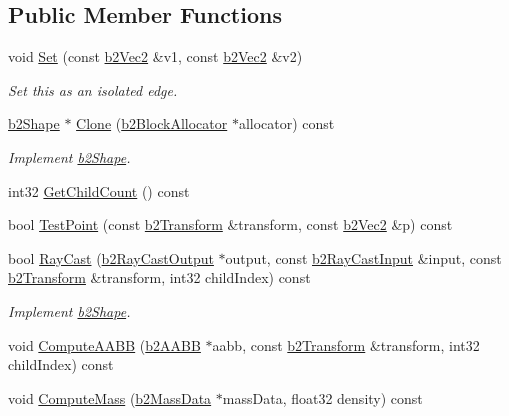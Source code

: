 \subsection*{Public Member Functions}
\begin{DoxyCompactItemize}
\item 
void \hyperlink{classb2_edge_shape_a67dd3b17630a600033cb4380697a4e9d}{Set} (const \hyperlink{structb2_vec2}{b2\+Vec2} \&v1, const \hyperlink{structb2_vec2}{b2\+Vec2} \&v2)\hypertarget{classb2_edge_shape_a67dd3b17630a600033cb4380697a4e9d}{}\label{classb2_edge_shape_a67dd3b17630a600033cb4380697a4e9d}

\begin{DoxyCompactList}\small\item\em Set this as an isolated edge. \end{DoxyCompactList}\item 
\hyperlink{classb2_shape}{b2\+Shape} $\ast$ \hyperlink{classb2_edge_shape_a24b5aaf94f659ea962dbfb1df220542d}{Clone} (\hyperlink{classb2_block_allocator}{b2\+Block\+Allocator} $\ast$allocator) const \hypertarget{classb2_edge_shape_a24b5aaf94f659ea962dbfb1df220542d}{}\label{classb2_edge_shape_a24b5aaf94f659ea962dbfb1df220542d}

\begin{DoxyCompactList}\small\item\em Implement \hyperlink{classb2_shape}{b2\+Shape}. \end{DoxyCompactList}\item 
int32 \hyperlink{classb2_edge_shape_a8c15a5a5aa8e7dc69826be17aaa82293}{Get\+Child\+Count} () const 
\item 
bool \hyperlink{classb2_edge_shape_a28a977f82e4bc1cf60a3143ba5636c22}{Test\+Point} (const \hyperlink{structb2_transform}{b2\+Transform} \&transform, const \hyperlink{structb2_vec2}{b2\+Vec2} \&p) const 
\item 
bool \hyperlink{classb2_edge_shape_aefbae6b3840f486b22ffecee7d0d15fd}{Ray\+Cast} (\hyperlink{structb2_ray_cast_output}{b2\+Ray\+Cast\+Output} $\ast$output, const \hyperlink{structb2_ray_cast_input}{b2\+Ray\+Cast\+Input} \&input, const \hyperlink{structb2_transform}{b2\+Transform} \&transform, int32 child\+Index) const \hypertarget{classb2_edge_shape_aefbae6b3840f486b22ffecee7d0d15fd}{}\label{classb2_edge_shape_aefbae6b3840f486b22ffecee7d0d15fd}

\begin{DoxyCompactList}\small\item\em Implement \hyperlink{classb2_shape}{b2\+Shape}. \end{DoxyCompactList}\item 
void \hyperlink{classb2_edge_shape_a30f601c611eb549f9f657eee89d82f9f}{Compute\+A\+A\+BB} (\hyperlink{structb2_a_a_b_b}{b2\+A\+A\+BB} $\ast$aabb, const \hyperlink{structb2_transform}{b2\+Transform} \&transform, int32 child\+Index) const 
\item 
void \hyperlink{classb2_edge_shape_a3a305707a07ca3dffa6f2eaff3735dff}{Compute\+Mass} (\hyperlink{structb2_mass_data}{b2\+Mass\+Data} $\ast$mass\+Data, float32 density) const 
\end{DoxyCompactItemize}
